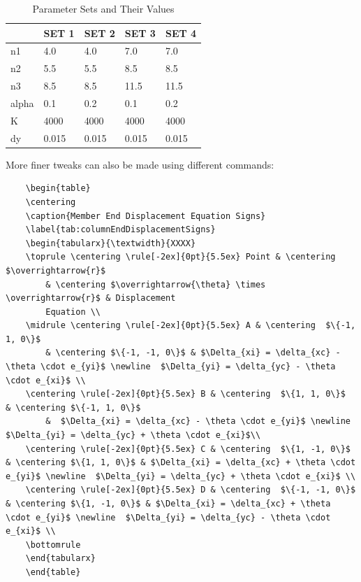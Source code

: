 \documentclass[10pt, a4paper]{article}
\begin{document}
\begin{table}
	\centering
	\caption{Parameter Sets and Their Values}
	\label{tab:fdParameterSets}
	\begin{tabularx}{\textwidth}{XXXXX}
		\toprule & SET 1 & SET 2 & SET 3 & SET 4 \\ 
		\midrule  
		n1 & 4.0 & 4.0 & 7.0 & 7.0 \\
		n2 & 5.5 & 5.5 & 8.5 & 8.5 \\ 
		n3 & 8.5 & 8.5 & 11.5 & 11.5 \\ 
		alpha & 0.1 & 0.2 & 0.1 & 0.2 \\ 
		K & 4000 & 4000 & 4000 & 4000 \\ 
		dy & 0.015 & 0.015 & 0.015 & 0.015 \\
		\bottomrule
	\end{tabularx}
\end{table}

More finer tweaks can also be made using different  commands:
\begin{verbatim}
	\begin{table}
	\centering
	\caption{Member End Displacement Equation Signs}
	\label{tab:columnEndDisplacementSigns}
	\begin{tabularx}{\textwidth}{XXXX}
	\toprule \centering \rule[-2ex]{0pt}{5.5ex} Point & \centering  $\overrightarrow{r}$ 
	    & \centering $\overrightarrow{\theta} \times \overrightarrow{r}$ & Displacement 
	    Equation \\ 
	\midrule \centering \rule[-2ex]{0pt}{5.5ex} A & \centering  $\{-1, 1, 0\}$ 
	    & \centering $\{-1, -1, 0\}$ & $\Delta_{xi} = \delta_{xc} - \theta \cdot e_{yi}$ \newline  $\Delta_{yi} = \delta_{yc} - \theta \cdot e_{xi}$ \\ 
	\centering \rule[-2ex]{0pt}{5.5ex} B & \centering  $\{1, 1, 0\}$  & \centering $\{-1, 1, 0\}$ 
	    &  $\Delta_{xi} = \delta_{xc} - \theta \cdot e_{yi}$ \newline  $\Delta_{yi} = \delta_{yc} + \theta \cdot e_{xi}$\\ 
	\centering \rule[-2ex]{0pt}{5.5ex} C & \centering  $\{1, -1, 0\}$ & \centering $\{1, 1, 0\}$ & $\Delta_{xi} = \delta_{xc} + \theta \cdot e_{yi}$ \newline  $\Delta_{yi} = \delta_{yc} + \theta \cdot e_{xi}$ \\ 
	\centering \rule[-2ex]{0pt}{5.5ex} D & \centering  $\{-1, -1, 0\}$  & \centering $\{1, -1, 0\}$ & $\Delta_{xi} = \delta_{xc} + \theta \cdot e_{yi}$ \newline  $\Delta_{yi} = \delta_{yc} - \theta \cdot e_{xi}$ \\ 
	\bottomrule
	\end{tabularx} 
	\end{table}
\end{verbatim}
\end{document}
